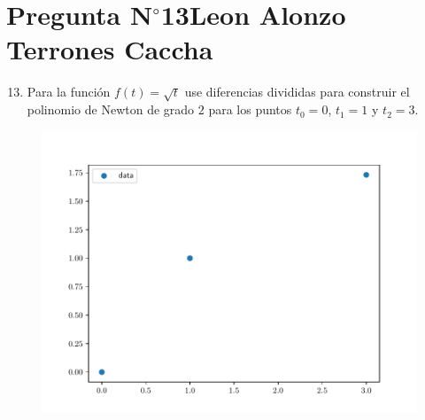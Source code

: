\section{Pregunta N$^{\circ}$13\qquad Leon Alonzo Terrones Caccha}

\begin{frame}
    \begin{enumerate}\setcounter{enumi}{12}
        \item


              Para la función
              \begin{math}
                  f\left(t\right)=
                  \sqrt{t}
              \end{math}
              use diferencias divididas para construir el polinomio
              de Newton de grado $2$ para los puntos $t_{0}=0$,
              $t_{1}=1$ y $t_{2}=3$.
    \end{enumerate}

    \begin{solution}

        \begin{figure}[ht!]
            \centering
            \includegraphics[width=.6\paperwidth]{p13}
        \end{figure}
    \end{solution}
\end{frame}